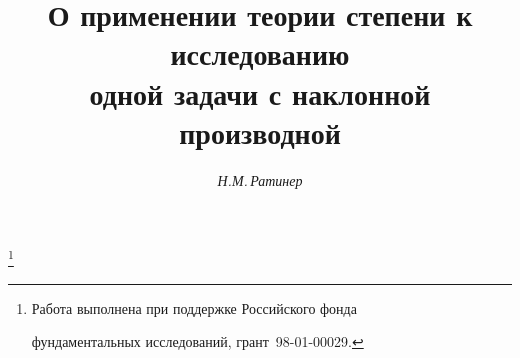




%





\newcommand{\fr}[2]{\frac {\partial #1} {\partial #2}}


\newcommand{\Ker}{\operatorname{Ker}}


\newcommand{\Coker}{\operatorname{Coker}}


\newcommand{\ind}{\operatorname{ind}}


\newcommand{\re}{\operatorname{Re}}


\newcommand{\im}{\operatorname{Im}}


\newcommand{\C}{\bold C}


\renewcommand{\l}{\lambda}


\newcommand{\f}{\wh f}


\newcommand{\tts}[1]{}










\setcounter{page}{43}















\author{\it Н.М.\,Ратинер}




\title{О применении теории степени к исследованию\\


одной задачи с наклонной производной}


\thanks{Работа выполнена при поддержке Российского фонда


фундаментальных исследований, грант \No\,98-01-00029.}





